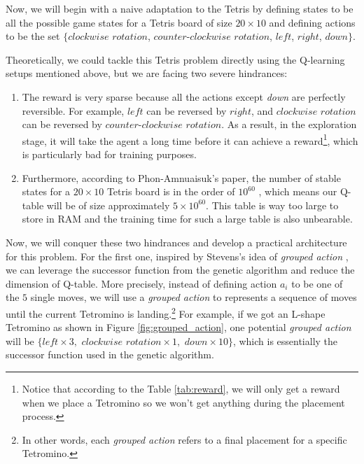 \documentclass[letterpaper]{article} %
\begin{document}
Now, we will begin with a naive adaptation to the Tetris by defining states to be all the possible game states for a Tetris board of size $20\times 10$ and defining actions to be the set $\{clockwise\,\,rotation$, $counter\textit{-}clockwise\,\,rotation$, $left$, $right$, $down\}$.

Theoretically, we could tackle this Tetris problem directly using the Q-learning setups mentioned above, but we are facing two severe hindrances:
\begin{enumerate}
  \item The reward is very sparse because all the actions except {\it down} are perfectly reversible. For example, $left$ can be reversed by $right$, and $clockwise\,\,rotation$ can be reversed by $counter\textit{-}clockwise\,\,rotation$. As a result, in the exploration stage, it will take the agent a long time before it can achieve a reward\footnote{Notice that according to the Table \ref{tab:reward}, we will only get a reward when we place a Tetromino so we won't get anything during the placement process.}, which is particularly bad for training purposes.
  \item Furthermore, according to Phon-Amnuaisuk's paper, the number of stable states for a $20\times 10$ Tetris board is in the order of $10^{60}$ \cite{somnuk_2015}, which means our Q-table will be of size approximately $5\times 10^{60}$. This table is way too large to store in RAM and the training time for such a large table is also unbearable.
\end{enumerate}

Now, we will conquer these two hindrances and develop a practical architecture for this problem. For the first one, inspired by Stevens's idea of \textit{grouped action} \cite{Stevens_2016}, we can leverage the successor function from the genetic algorithm and reduce the dimension of Q-table. More precisely, instead of defining action $a_i$ to be one of the $5$ single moves, we will use a \textit{grouped action} to represents a sequence of moves until the current Tetromino is landing.\footnote{In other words, each \textit{grouped action} refers to a final placement for a specific Tetromino.} For example, if we got an L-shape Tetromino as shown in Figure \ref{fig:grouped_action}, one potential \textit{grouped action} will be $\{left\times 3, \,\,clockwise\,\,rotation \times 1,\,\,down\times 10\}$, which is essentially the successor function used in the genetic algorithm.
\end{document}
